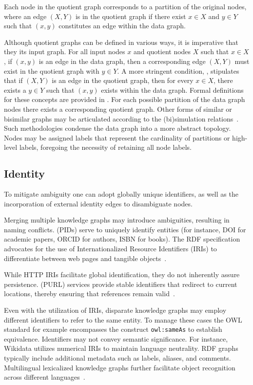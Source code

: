 Each node in the quotient graph corresponds to a partition of the original nodes, where an edge $(X,Y)$ is in the quotient graph if there exist $x\in X$ and $y\in Y$ such that $(x,y)$ constitutes an edge within the data graph.

Although quotient graphs can be defined in various ways, it is imperative that they  its input graph. For all input nodes $x$ and quotient nodes $X$ such that $x\in X$, if $(x,y)$ is an edge in the data graph, then a corresponding edge $(X,Y)$ must exist in the quotient graph with $y\in Y$. A more stringent condition, , stipulates that if $(X,Y)$ is an edge in the quotient graph, then for every $x\in X$, there exists a $y\in Y$ such that $(x,y)$ exists within the data graph. Formal definitions for these concepts are provided in .
For each possible partition of the data graph nodes there exists a  corresponding quotient graph. Other forms of similar or bisimilar graphs may be articulated according to the (bi)simulation relations~\cite{Cebiric2019SummarizingSemanticGraphs}. Such methodologies condense the data graph into a more abstract topology. Nodes may be assigned labels that represent the cardinality of partitions or high-level labels, foregoing the necessity of retaining all node labels.

\subsection{Identity}\label{identity}
To mitigate ambiguity one can adopt globally unique identifiers, as well as the incorporation of external identity edges to disambiguate nodes.

Merging multiple knowledge graphs may introduce ambiguities, resulting in naming conflicts.  (PIDs) serve to uniquely identify entities (for instance, DOI for academic papers, ORCID for authors, ISBN for books). The RDF specification advocates for the use of Internationalized Resource Identifiers (IRIs) to differentiate between web pages and tangible objects~\cite{Hakala2010PIDs}.

While HTTP IRIs facilitate global identification, they do not inherently assure persistence.  (PURL) services provide stable identifiers that redirect to current locations, thereby ensuring that references remain valid~\cite{BernersLee2006LinkedData}\cite{Heath2011LinkedData}.

Even with the utilization of IRIs, disparate knowledge graphs may employ different identifiers to refer to the same entity. To manage these cases the OWL standard for example encompasses the construct \texttt{owl:sameAs} to establish equivalence.
Identifiers may not convey semantic significance. For instance, Wikidata utilizes numerical IRIs to maintain language neutrality. RDF graphs typically include additional metadata such as labels, aliases, and comments. Multilingual lexicalized knowledge graphs further facilitate object recognition across different languages~\cite{DeMelo2015Lexvo.org, MartinezRodriguez2020InformationExtractionMeetsSemanticWeb}.  

